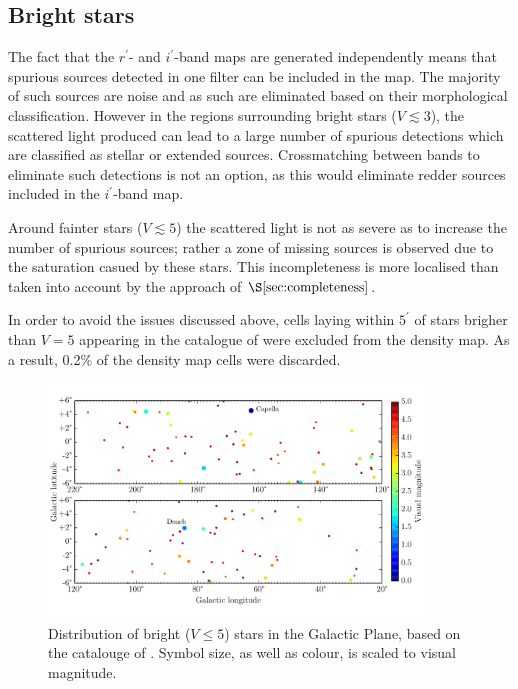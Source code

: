 \documentclass[a4paper,useAMS,usenatbib]{mn2e}
\begin{document}
\subsection{Bright stars}
The fact that the $r^{\prime}$- and $i^{\prime}$-band maps are generated independently means that spurious sources detected in one filter can be included in the map. The majority of such sources are noise and as such are eliminated based on their morphological classification. However in the regions surrounding bright stars ($V\lesssim3$), the scattered light produced can lead to a large number of spurious detections which are classified as stellar or extended sources. Crossmatching between bands to eliminate such detections is not an option, as this would eliminate redder sources included in the $i^{\prime}$-band map.

Around fainter stars ($V\lesssim5$) the scattered light is not as severe as to increase the number of spurious sources; rather a zone of missing sources is observed due to the saturation casued by these stars. This incompleteness is more localised than taken into account by the approach of $\S\ref{sec:completeness}$.

In order to avoid the issues discussed above, cells laying within $5^{\prime}$ of stars brigher than $V=5$ appearing in the catalogue of \citet{Hoffleit1991} were excluded from the density map. As a result, 0.2\% of the density map cells were discarded.

\begin{figure}
\begin{center}
\includegraphics[width=0.9\textwidth]{figures/bright_stars.pdf} 
\caption{\footnotesize Distribution of bright ($V\leq5$) stars in the Galactic Plane, based on the catalouge of \citet{Hoffleit1991}. Symbol size, as well as colour, is scaled to visual magnitude.}
\label{fig:bright_stars}
\end{center}
\end{figure}
\end{document}
